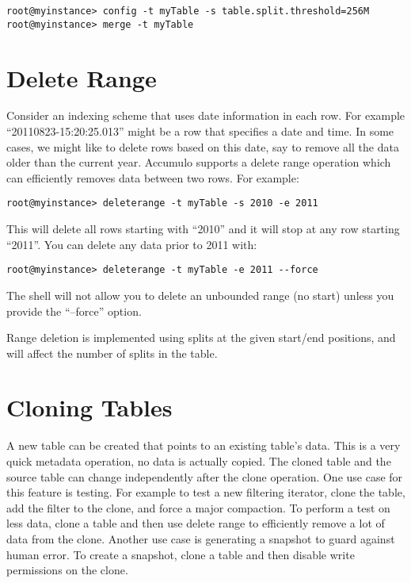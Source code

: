 \small
\begin{verbatim}
root@myinstance> config -t myTable -s table.split.threshold=256M
root@myinstance> merge -t myTable
\end{verbatim}
\normalsize

\section{Delete Range}

Consider an indexing scheme that uses date information in each row.
For example ``20110823-15:20:25.013'' might be a row that specifies a
date and time.  In some cases, we might like to delete rows based on
this date, say to remove all the data older than the current year.
Accumulo supports a delete range operation which can efficiently
removes data between two rows.  For example:

\small
\begin{verbatim}
root@myinstance> deleterange -t myTable -s 2010 -e 2011
\end{verbatim}
\normalsize

This will delete all rows starting with ``2010'' and it will stop at
any row starting ``2011''.  You can delete any data prior to 2011
with:

\small
\begin{verbatim}
root@myinstance> deleterange -t myTable -e 2011 --force
\end{verbatim}
\normalsize

The shell will not allow you to delete an unbounded range (no start)
unless you provide the ``--force'' option.

Range deletion is implemented using splits at the given start/end
positions, and will affect the number of splits in the table.

\section{Cloning Tables}

A new table can be created that points to an existing table's data.  This is a
very quick metadata operation, no data is actually copied.  The cloned table
and the source table can change independently after the clone operation.  One
use case for this feature is testing.  For example to test a new filtering
iterator, clone the table, add the filter to the clone, and force a major
compaction.  To perform a test on less data, clone a table and then use delete
range to efficiently remove a lot of data from the clone.  Another use case is
generating a snapshot to guard against human error.  To create a snapshot,
clone a table and then disable write permissions on the clone.

